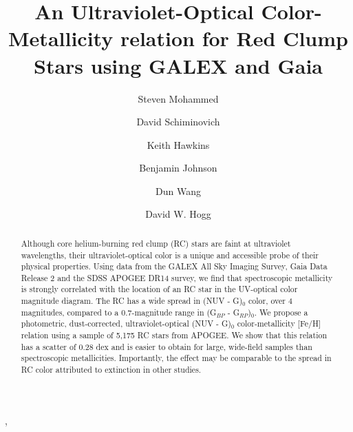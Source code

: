 \documentclass[twocolumn]{emulateapj}
\begin{document}
\title{An Ultraviolet-Optical Color-Metallicity relation for Red Clump Stars using GALEX and Gaia}

\author{Steven Mohammed}

\author{David Schiminovich}

\author{Keith Hawkins}

\author{Benjamin Johnson}

\author{Dun Wang}
, 

\author{David W. Hogg}





\begin{abstract}
Although core helium-burning red clump (RC) stars are faint at ultraviolet wavelengths, their ultraviolet-optical color is a unique and accessible probe of their physical properties. Using data from the GALEX All Sky Imaging Survey, Gaia Data Release 2 and the SDSS APOGEE DR14 survey, we find that spectroscopic metallicity is strongly correlated with the location of an RC star in the UV-optical color magnitude diagram.  The RC has a wide spread in (NUV - G)$_0$ color, over 4 magnitudes, compared to a 0.7-magnitude range in (G$_{BP}$ - G$_{RP}$)$_0$. We propose a photometric, dust-corrected, ultraviolet-optical (NUV - G)$_0$ color-metallicity [Fe/H] relation using a sample of 5,175 RC stars from APOGEE. We show that this relation has a scatter of 0.28 dex and is easier to obtain for large, wide-field samples than spectroscopic metallicities. Importantly, the effect may be comparable to the spread in RC color attributed to extinction in other studies.
\end{abstract}
 
\end{document}
